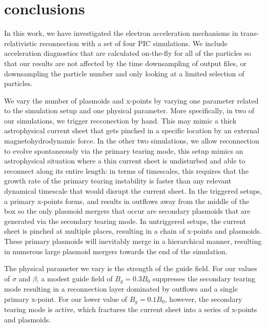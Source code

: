 \documentclass[iop,twocolappendix]{emulateapj}
\begin{document}
\section{conclusions}
In this work, we have investigated the electron acceleration mechanisms in trans-relativistic reconnection with a set of four PIC simulations.  We include acceleration diagnostics that are calculated on-the-fly for all of the particles so that our results are not affected by the time downsampling of output files, or downsampling the particle number and only looking at a limited selection of particles.  

We vary the number of plasmoids and x-points by varying one parameter related to the simulation setup and one physical parameter.  More specifically, in two of our simulations, we trigger recconection by hand.  This may mimic a thick astrophysical current sheet that gets pinched in a specific location by an external magnetohydrodynamic force.  In the other two simulations, we allow reconnection to evolve spontaneously via the primary tearing mode, this setup mimics an astrophysical situation where a thin current sheet is undisturbed and able to reconnect along its entire length:  in terms of timescales, this requires that the growth rate of the primary tearing instability is faster than any relevant dynamical timescale that would disrupt the current sheet.  In the triggered setups, a primary x-points forms, and results in outflows away from the middle of the box so the only plasmoid mergers that occur are secondary plasmoids that are generated via the secondary tearing mode.  In untriggered setups, the current sheet is pinched at multiple places, resulting in a chain of x-points and plasmoids.  These primary plasmoids will inevitably merge in a hierarchical manner, resulting in numerous large plasmoid mergers towards the end of the simulation.

The physical parameter we vary is the strength of the guide field.  For our values of $\sigma$ and $\beta$, a modest guide field of $B_{g}=0.3B_{0}$ suppresses the secondary tearing mode resulting in a reconnection layer dominated by outflows and a single primary x-point.  For our lower value of $B_{g}=0.1B_{0}$, however, the secondary tearing mode is active, which fractures the current sheet into a series of x-points and plasmoids.
\end{document}
